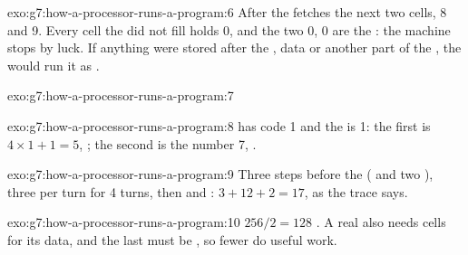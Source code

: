 \begin{solution}{exo:g7:how-a-processor-runs-a-program:6}
After  the  fetches the next two cells, 8 and 9. Every
cell the  did not fill holds 0, and the two  0, 0 are the
 : the machine stops by luck. If anything were stored
after the , data or another part of the , the  would
run it as .
\end{solution}

\begin{solution}{exo:g7:how-a-processor-runs-a-program:7}
\label{lst:g7:how-a-processor-runs-a-program:sol-five}
\end{solution}

\begin{solution}{exo:g7:how-a-processor-runs-a-program:8}
 has code 1 and the  is 1: the first  is
$4 \times 1 + 1 = 5$, ; the second is the number 7,
.
\end{solution}

\begin{solution}{exo:g7:how-a-processor-runs-a-program:9}
Three steps before the  ( and two ), three per turn
for 4 turns, then  and : $3 + 12 + 2 = 17$, as the trace
says.
\end{solution}

\begin{solution}{exo:g7:how-a-processor-runs-a-program:10}
$256 / 2 = 128$ . A real  also needs cells for its data,
and the last  must be , so fewer  do useful
work.
\end{solution}

